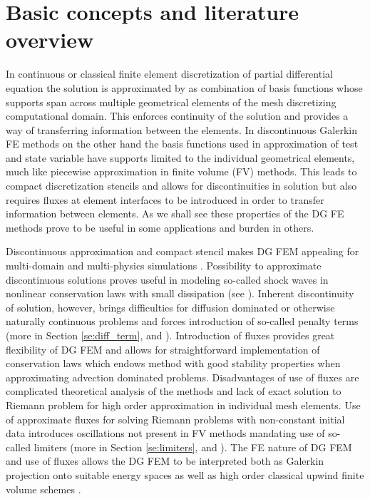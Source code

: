 \section{Basic concepts and literature overview}
In continuous or classical finite element discretization of partial differential equation 
the solution is approximated by as combination of basis functions whose supports span 
across multiple geometrical elements of the mesh discretizing computational domain. This 
enforces continuity of the solution and provides a way of transferring information 
between the elements. In discontinuous Galerkin FE methods on the other hand the 
basis functions used in approximation of test and state variable have supports limited to 
the individual geometrical elements, much like piecewise approximation in finite volume 
(FV) methods. This leads to compact discretization stencils and allows for 
discontinuities in solution but also requires fluxes at element interfaces to be 
introduced in order to transfer information between elements. As we shall see these 
properties of the DG FE methods prove to be useful in some applications and burden in 
others.

Discontinuous approximation and compact stencil makes DG FEM appealing for 
multi-domain and multi-physics simulations \cite{DiPietro2012}.
Possibility to approximate discontinuous solutions proves useful in modeling so-called 
shock waves in nonlinear conservation laws with small dissipation \cite{Kucera}(see 
). Inherent discontinuity of solution, however, brings difficulties 
for diffusion 
dominated or otherwise naturally continuous problems and forces introduction of so-called 
penalty terms (more in Section \ref{se:diff_term}, \cite{Antonietti2013} and  
\cite{Kucera}). Introduction of fluxes provides great flexibility of DG FEM and allows 
for straightforward implementation of conservation laws which endows method with 
good stability properties when approximating advection dominated problems. 
Disadvantages of use of fluxes are complicated theoretical analysis of the 
methods and lack of exact solution to Riemann problem for high order approximation in 
individual mesh elements. Use of approximate fluxes for solving Riemann problems with 
non-constant initial data introduces oscillations not present in FV methods 
mandating use of so-called limiters (more in Section \ref{se:limiters}, 
\cite{Krivodonova2007} and \todo). The FE nature of DG FEM and use of fluxes allows the 
DG FEM 
to be interpreted both as Galerkin projection onto suitable energy spaces as well as high 
order classical upwind finite volume schemes \cite{Georgoulis2011}. 





